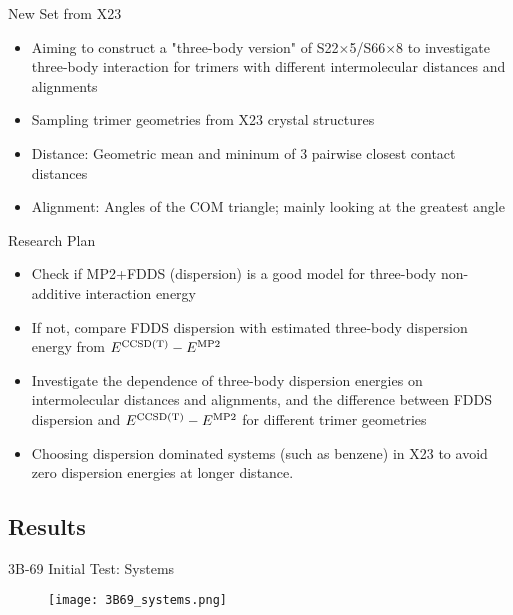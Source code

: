 \documentclass{beamer}
\begin{document}
        \begin{frame}{New Set from X23}
            \begin{itemize}
                \item Aiming to construct a "three-body version" of S22$\times$5/S66$\times$8 to investigate three-body interaction for trimers with different intermolecular distances and alignments
                \item Sampling trimer geometries from X23 crystal structures
                \item Distance: Geometric mean and mininum of 3 pairwise closest contact distances 
                \item Alignment: Angles of the COM triangle; mainly looking at the greatest angle
            \end{itemize}
        \end{frame}

        \begin{frame}{Research Plan}
            \begin{itemize}
                \item Check if MP2+FDDS (dispersion) is a good model for three-body non-additive interaction energy
                \item If not, compare FDDS dispersion with estimated three-body dispersion energy from $E^{\rm{CCSD(T)}} - E^{\rm{MP2}}$
                \item Investigate the dependence of three-body dispersion energies on intermolecular distances and alignments, and the difference between FDDS dispersion and $E^{\rm{CCSD(T)}} - E^{\rm{MP2}}$ for different trimer geometries
                \item Choosing dispersion dominated systems (such as benzene) in X23 to avoid zero dispersion energies at longer distance.
            \end{itemize}
        \end{frame}

    \subsection{Results}

        \begin{frame}{3B-69 Initial Test: Systems}
            \begin{figure}
                \centering
                \texttt{[image: 3B69\_systems.png]}
            \end{figure}
        \end{frame}
        
\end{document}
